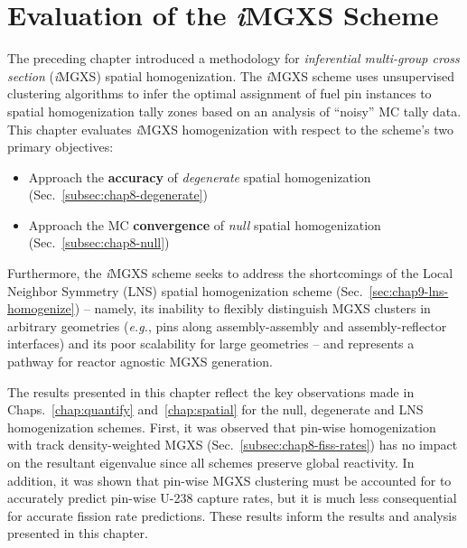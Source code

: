 \chapter{Evaluation of the \textit{i}MGXS Scheme}
\label{chap:results}

The preceding chapter introduced a methodology for \textit{inferential multi-group cross section} (\textit{i}\ac{MGXS}) spatial homogenization. The \textit{i}\ac{MGXS} scheme uses unsupervised clustering algorithms to infer the optimal assignment of fuel pin instances to spatial homogenization tally zones based on an analysis of ``noisy'' \ac{MC} tally data. This chapter evaluates \textit{i}\ac{MGXS} homogenization with respect to the scheme's two primary objectives:

\begin{itemize}[noitemsep]
\item Approach the \textbf{accuracy} of \textit{degenerate} spatial homogenization (Sec.~\ref{subsec:chap8-degenerate})
\item Approach the \ac{MC} \textbf{convergence} of \textit{null} spatial homogenization (Sec.~\ref{subsec:chap8-null})
\end{itemize}

\noindent Furthermore, the \textit{i}\ac{MGXS} scheme seeks to address the shortcomings of the Local Neighbor Symmetry (\ac{LNS}) spatial homogenization scheme (Sec.~\ref{sec:chap9-lns-homogenize}) -- namely, its inability to flexibly distinguish \ac{MGXS} clusters in arbitrary geometries (\textit{e.g.}, pins along assembly-assembly and assembly-reflector interfaces) and its poor scalability for large geometries -- and represents a pathway for reactor agnostic \ac{MGXS} generation.

The results presented in this chapter reflect the key observations made in Chaps.~\ref{chap:quantify} and~\ref{chap:spatial} for the null, degenerate and \ac{LNS} homogenization schemes. First, it was observed that pin-wise homogenization with track density-weighted \ac{MGXS} (Sec.~\ref{subsec:chap8-fiss-rates}) has no impact on the resultant eigenvalue since all schemes preserve global reactivity. In addition, it was shown that pin-wise \ac{MGXS} clustering must be accounted for to accurately predict pin-wise U-238 capture rates, but it is much less consequential for accurate fission rate predictions. These results inform the results and analysis presented in this chapter.


